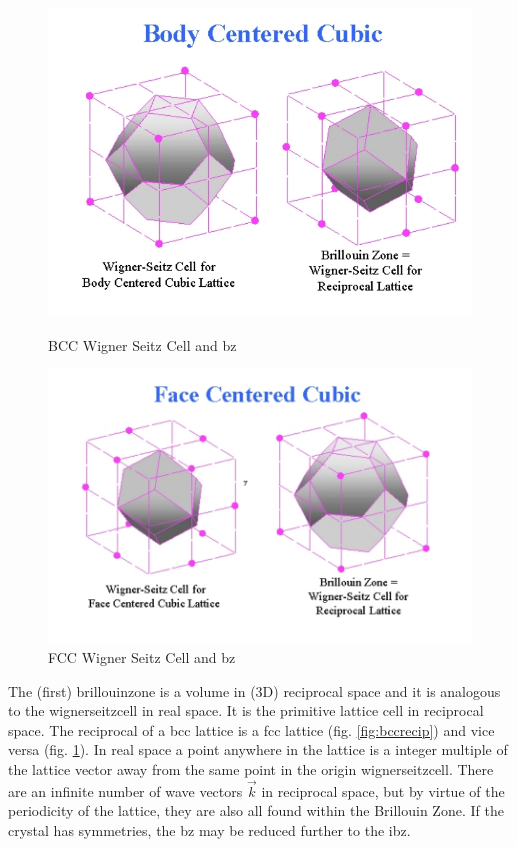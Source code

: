 \FloatBarrier
\begin{figure}[!htb]
\includegraphics[width=\linewidth]{chapters/background_potential_fitting/images/bcc_wcs_bz.png}
\caption{BCC Wigner Seitz Cell and \acrshort{bz} \cite{fccbccreciprocal}}
\label{fig:bccrecip}
\endminipage\hfill
{}
\includegraphics[width=\linewidth]{chapters/background_potential_fitting/images/fcc_wcs_bz.png}
\caption{FCC Wigner Seitz Cell and \acrshort{bz} \cite{fccbccreciprocal}}
\label{fig:fccrecip}
\endminipage
\end{figure}
\FloatBarrier

The (first) \Gls{brillouinzone} is a volume in (3D) reciprocal space and it is analogous to the \Gls{wignerseitzcell} in real space.  It is the primitive lattice cell in reciprocal space.  The reciprocal of a \acrshort{bcc} lattice is a \acrshort{fcc} lattice (fig. \ref{fig:bccrecip}) and vice versa (fig. \ref{fig:fccrecip}).  In real space a point anywhere in the lattice is a integer multiple of the lattice vector away from the same point in the origin \Gls{wignerseitzcell}.  There are an infinite number of wave vectors $\vec{k}$ in reciprocal space, but by virtue of the periodicity of the lattice, they are also all found within the Brillouin Zone.  If the crystal has symmetries, the \acrshort{bz} may be reduced further to the \acrlong{ibz}.

